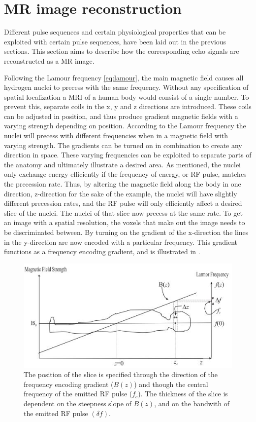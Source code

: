 \section{MR image reconstruction}\label{sec:IMrec}

Different pulse sequences and certain physiological properties that can be exploited with certain pulse sequences, have been laid out in the previous sections. This section aims to describe how the corresponding echo signals are reconstructed as a MR image.

Following the Lamour frequency \eqref{eq:lamour}, the main magnetic field causes all hydrogen nuclei to precess with the same frequency. Without any specification of spatial localization a MRI of a human body would consist of a single number. To prevent this, separate coils in the x, y and z directions are introduced. These coils can be adjusted in position, and thus produce gradient magnetic fields with a varying strength depending on position. According to the Lamour frequency the nuclei will precess with different frequencies when in a magnetic field with varying strength. The gradients can be turned on in combination to create any direction in space. These varying frequencies can be exploited to separate parts of the anatomy and ultimately illustrate a desired area. As mentioned, the nuclei only exchange energy efficiently if the frequency of energy, or RF pulse, matches the precession rate. Thus, by altering the magnetic field along the body in one direction, z-direction for the sake of the example, the nuclei will have slightly different precession rates, and the RF pulse will only efficiently affect a desired slice of the nuclei.
The nuclei of that slice now precess at the same rate. To get an image with a spatial resolution, the voxels that make out the image needs to be discriminated between. By turning on the gradient of the x-direction the lines in the y-direction are now encoded with a particular frequency. This gradient functions as a frequency encoding gradient, and is illustrated in . \cite{Bharath2008} \\
 \begin{figure}[H]                 
	\includegraphics[width=.7\textwidth]{figures/aBackground/gradient}  
	\caption{The position of the slice is specified through the direction of the frequency encoding gradient ($B(z)$) and though the central frequency of the emitted RF pulse ($f_c$). The thickness of the slice is dependent on the steepness slope of $B(z)$, and on the bandwith of the emitted RF pulse $(\delta f)$. \cite{Bharath2008}}
	\label{fig:back:gradient} 
\end{figure}
